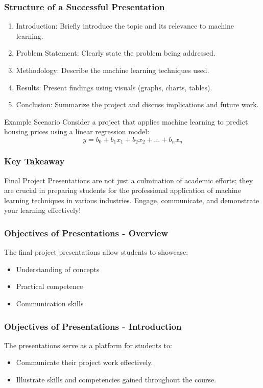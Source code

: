 \documentclass[aspectratio=169]{beamer}
\begin{document}
\begin{frame}[fragile]
    \frametitle{Structure of a Successful Presentation}

    \begin{enumerate}
        \item Introduction: Briefly introduce the topic and its relevance to machine learning.
        \item Problem Statement: Clearly state the problem being addressed.
        \item Methodology: Describe the machine learning techniques used.
        \item Results: Present findings using visuals (graphs, charts, tables).
        \item Conclusion: Summarize the project and discuss implications and future work.
    \end{enumerate}

    \begin{block}{Example Scenario}
        Consider a project that applies machine learning to predict housing prices using a linear regression model:
        \[
        y = b_0 + b_1x_1 + b_2x_2 + \ldots + b_nx_n
        \]
    \end{block}
\end{frame}

\begin{frame}[fragile]
    \frametitle{Key Takeaway}
    
    Final Project Presentations are not just a culmination of academic efforts; they are crucial in preparing students for the professional application of machine learning techniques in various industries. Engage, communicate, and demonstrate your learning effectively!
\end{frame}

\begin{frame}[fragile]
    \frametitle{Objectives of Presentations - Overview}
    The final project presentations allow students to showcase:
    \begin{itemize}
        \item Understanding of concepts
        \item Practical competence
        \item Communication skills
    \end{itemize}
\end{frame}

\begin{frame}[fragile]
    \frametitle{Objectives of Presentations - Introduction}
    The presentations serve as a platform for students to:
    \begin{itemize}
        \item Communicate their project work effectively.
        \item Illustrate skills and competencies gained throughout the course.
    \end{itemize}
\end{frame}
\end{document}
